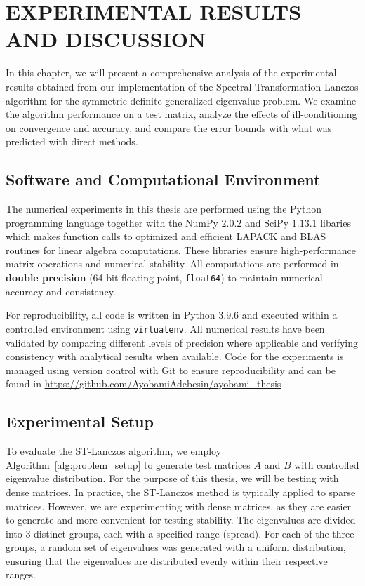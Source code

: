 \chapter{EXPERIMENTAL RESULTS AND DISCUSSION}

In this chapter, we will present a comprehensive analysis of the experimental results obtained from our implementation of the Spectral Transformation Lanczos algorithm for the symmetric definite generalized eigenvalue problem. We examine the algorithm performance on a test matrix, analyze the effects of ill-conditioning on convergence and accuracy, and compare the error bounds with what was predicted with direct methods.

\section{Software and Computational Environment}
The numerical experiments in this thesis are performed using the Python programming language together with the NumPy $2.0.2$ and SciPy $1.13.1$ libaries which makes function calls to optimized and efficient LAPACK and BLAS routines for linear algebra computations. These libraries ensure high-performance matrix operations and numerical stability. All computations are performed in \textbf{double precision} (64 bit floating point, \texttt{float64}) to maintain numerical accuracy and consistency.

For reproducibility, all code is written in Python $3.9.6$ and executed within a controlled environment using \texttt{virtualenv}. All numerical results have been validated by comparing different levels of precision where applicable and verifying consistency with analytical results when available. Code for the experiments is managed using version control with Git to ensure reproducibility and can be found in \href{https://github.com/AyobamiAdebesin/ayobami_thesis}{https://github.com/AyobamiAdebesin/ayobami\_thesis}

\section{Experimental Setup}
To evaluate the ST-Lanczos algorithm, we employ Algorithm~\ref{alg:problem_setup} to generate test matrices $A$ and $B$ with controlled eigenvalue distribution. For the purpose of this thesis, we will be testing with dense matrices. In practice, the ST-Lanczos method is typically applied to sparse matrices. However, we are experimenting with dense matrices, as they are easier to generate and more convenient for testing stability. The eigenvalues are divided into 3 distinct groups, each with a specified range (spread). For each of the three groups, a random set of eigenvalues was generated with a uniform distribution, ensuring that the eigenvalues are distributed evenly within their respective ranges.

